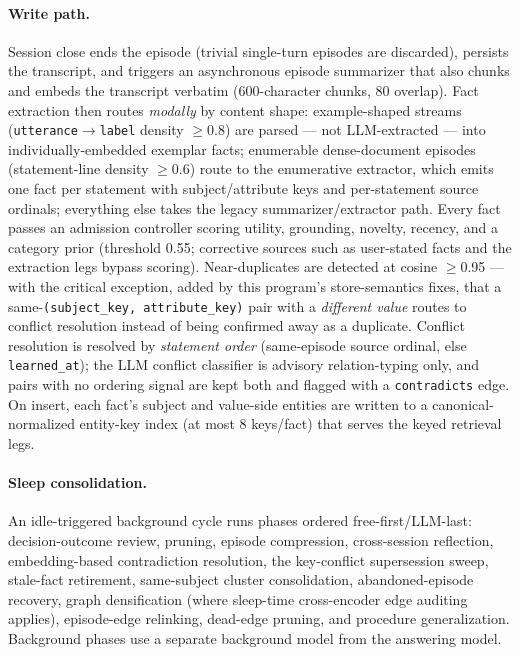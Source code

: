 \documentclass{article}
\begin{document}
\paragraph{Write path.}
Session close ends the episode (trivial single-turn episodes are discarded),
persists the transcript, and triggers an asynchronous episode summarizer
that also chunks and embeds the transcript verbatim (600-character chunks,
80 overlap). Fact extraction then routes \emph{modally} by content shape:
example-shaped streams (\texttt{utterance$\to$label} density $\geq$0.8) are
parsed --- not LLM-extracted --- into individually-embedded exemplar facts;
enumerable dense-document episodes (statement-line density
$\geq$0.6) route to the enumerative extractor, which emits one fact
per statement with subject/attribute keys and per-statement source ordinals;
everything else takes the legacy summarizer/extractor path. Every fact
passes an admission controller scoring utility, grounding, novelty, recency,
and a category prior (threshold 0.55; corrective sources such as
user-stated facts and the extraction legs bypass scoring). Near-duplicates
are detected at cosine $\geq$0.95 --- with the critical exception, added by
this program's store-semantics fixes, that a same-\texttt{(subject\_key,
attribute\_key)} pair with a \emph{different value} routes to conflict
resolution instead of being confirmed away as a duplicate. Conflict
resolution is resolved by \emph{statement order} (same-episode source
ordinal, else \texttt{learned\_at}); the LLM conflict classifier is advisory
relation-typing only, and pairs with no ordering signal are kept both and
flagged with a \texttt{contradicts} edge. On insert, each fact's subject and
value-side entities are written to a canonical-normalized entity-key index
(at most 8 keys/fact) that serves the keyed retrieval legs.

\paragraph{Sleep consolidation.}
An idle-triggered background cycle runs phases ordered free-first/LLM-last:
decision-outcome review, pruning, episode compression, cross-session
reflection, embedding-based contradiction resolution, the key-conflict
supersession sweep, stale-fact retirement, same-subject cluster
consolidation, abandoned-episode recovery, graph densification (where
sleep-time cross-encoder edge auditing applies), episode-edge relinking,
dead-edge pruning, and procedure generalization. Background phases use a
separate background model from the answering model.
\end{document}
